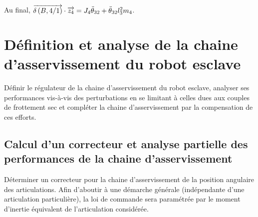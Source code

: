 \documentclass[10pt,fleqn]{article} %
\begin{document}
%
%
%  
%  
%
  
  Au final,  $\overrightarrow{\delta \left( {B}, {4} /{1}\right)}\cdot\overrightarrow{z_4} = J_4 \ddot{\theta}_{32}+\ddot{\theta}_{32}l_3^2 m_4 $.


\subparagraph{}%

\subparagraph{}%

\subparagraph{}%

\section{Définition et analyse de la chaine d’asservissement du robot esclave}
\begin{obj}
Définir le régulateur de la chaine d’asservissement du robot esclave, analyser ses performances vis-à-vis
des perturbations en se limitant à celles dues aux couples de frottement sec et compléter la chaine
d’asservissement par la compensation de ces efforts.
\end{obj}

\subsection{Calcul d’un correcteur et analyse partielle des performances de la chaine d’asservissement}
\begin{obj}
Déterminer un correcteur pour la chaine d’asservissement de la position angulaire des articulations.
Afin d’aboutir à une démarche générale (indépendante d’une articulation particulière), la loi de commande
sera paramétrée par le moment d’inertie équivalent de l’articulation considérée.
\end{obj}
\end{document}
